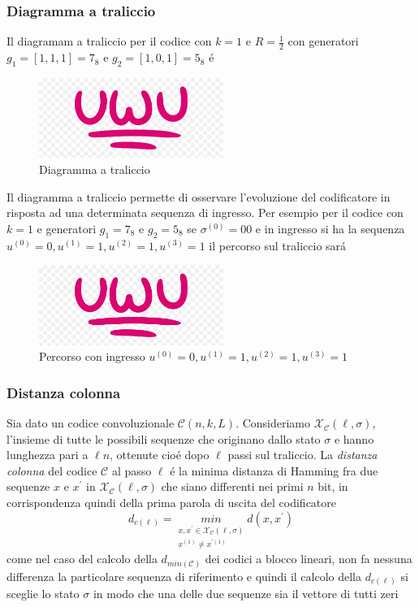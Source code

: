         \subsubsection{Diagramma a traliccio}
            Il diagramam a traliccio per il codice con $k=1$ e $R=\frac{1}{2}$ con generatori $g_1 = [1,1,1] = 7_8$ e $g_2 = [1,0,1] = 5_8$ é 
            \begin{figure}[H]
                \centering
                \includegraphics[width = 6cm]{media/uwu.png}
                \caption{Diagramma a traliccio}
            \end{figure}
            Il diagramma a traliccio permette di osservare l'evoluzione del codificatore in risposta ad una determinata sequenza di ingresso.
            Per esempio per il codice con $k=1$ e generatori $g_1 = 7_8$ e $g_2 = 5_8$ se $\sigma^{(0)} = 00$ e in ingresso si ha la 
            sequenza $u^{(0)} = 0,u^{(1)} = 1,u^{(2)} = 1,u^{(3)} = 1$ il percorso sul traliccio sará  
            \begin{figure}[H]
                \centering
                \includegraphics[width = 6cm]{media/uwu.png}
                \caption{Percorso con ingresso $u^{(0)} = 0,u^{(1)} = 1,u^{(2)} = 1,u^{(3)} = 1$}
            \end{figure}
        \subsubsection{Distanza colonna}
            Sia dato un codice convoluzionale $\mathcal{C}(n,k,L)$. Consideriamo $\mathcal{X}_\mathcal{C}(\ell,\sigma)$, l'insieme
            di tutte le possibili sequenze che originano dallo stato $\sigma$ e hanno lunghezza pari a $\ell n$, ottenute cioé dopo 
            $\ell$ passi sul traliccio. La \emph{distanza colonna} del codice $\mathcal{C}$ al passo $\ell$ é la minima distanza di Hamming
            fra due sequenze $x$ e $x^\prime$ in $\mathcal{X}_\mathcal{C}(\ell,\sigma)$ che siano differenti nei primi $n$ bit, in corrispondenza
            quindi della prima parola di uscita del codificatore 
            \[
                d_{c(\ell)} = \underset{\substack{x,x^\prime \in \mathcal{X}_\mathcal{C}(\ell,\sigma) \\ x^{(1)}\neq x^{\prime(1)} }}{min} d(x,x^\prime)  
            \]
            come nel caso del calcolo della $d_{min(\mathcal{C})}$ dei codici a blocco lineari, non fa nessuna differenza la particolare
            sequenza di riferimento e quindi il calcolo della $d_{c(\ell)}$ si sceglie lo stato $\sigma$ in modo che una delle due 
            sequenze sia il vettore di tutti zeri
